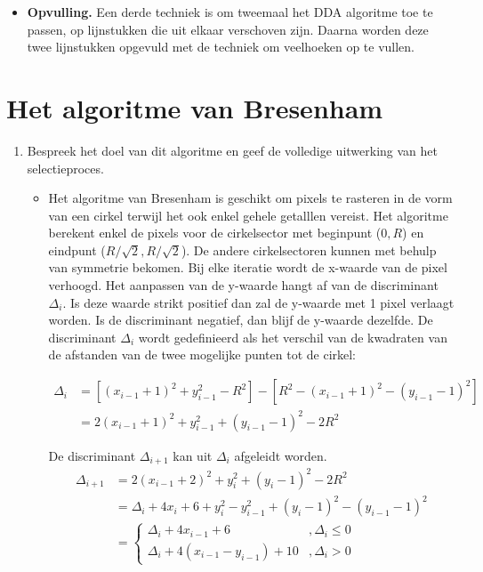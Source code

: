 \documentclass{report}
\newcommand{\vraag}[2]{
	\item #1
	
	#2
}
\begin{document}
\begin{enumerate}
{\begin{itemize}
				\item \textbf{Opvulling.} Een derde techniek is om tweemaal het DDA algoritme toe te passen, op lijnstukken die uit elkaar verschoven zijn. Daarna worden deze twee lijnstukken opgevuld met de techniek om veelhoeken op te vullen.
			\end{itemize}
		}
		
	\end{enumerate}

	\section{Het algoritme van Bresenham}
	\begin{enumerate}
		\vraag
		{
			Bespreek het doel van dit algoritme en geef de volledige uitwerking van het selectieproces. \accentuate{(§1.3)}
	    }
		{
			\begin{itemize}
				\item Het algoritme van Bresenham is geschikt om pixels te rasteren in de vorm van een cirkel terwijl het ook enkel gehele getalllen vereist. Het algoritme berekent enkel de pixels voor de cirkelsector met beginpunt ($0, R$) en eindpunt ($R/\sqrt{2},R/\sqrt{2}$). De andere cirkelsectoren kunnen met behulp van symmetrie bekomen. Bij elke iteratie wordt de x-waarde van de pixel verhoogd. Het aanpassen van de y-waarde hangt af van de discriminant $\Delta_i$. Is deze waarde strikt positief dan zal de y-waarde met 1 pixel verlaagt worden. Is de discriminant negatief, dan blijf de y-waarde dezelfde. De discriminant $\Delta_i$ wordt gedefinieerd als het verschil van de kwadraten van de afstanden van de twee mogelijke punten tot de cirkel:
				
				\begin{equation*}
					\begin{split}
						\Delta_i & = [(x_{i - 1} + 1)^2 + y_{i - 1}^2 - R^2] - [R^2 - (x_{i - 1} + 1)^2 - (y_{i - 1} - 1)^2]  \\
						& = 2(x_{i - 1} + 1)^2 + y_{i - 1}^2 + (y_{i - 1} - 1)^2 - 2R^2
					\end{split}
				\end{equation*}	
				
				De discriminant $\Delta_{i + 1}$ kan uit $\Delta_i$ afgeleidt worden.
				\begin{equation*}
					\begin{split}
						\Delta_{i + 1} & = 2(x_{i - 1} + 2)^2 + y_i^2 + (y_i - 1)^2 - 2R^2 \\
									   & = \Delta_i + 4x_i + 6 + y_i^2 - y_{i - 1}^2 + (y_i - 1)^2 - (y_{i - 1} - 1)^2 \\
									   & = \begin{cases}
											  \Delta_i + 4x_{i - 1} + 6 &, \Delta_i \leq 0 \\
											  \Delta_i + 4(x_{i - 1} - y_{i - 1}) + 10  &, \Delta_i > 0
									 	   \end{cases}
					\end{split}
				\end{equation*}
				

\end{itemize}}
\end{enumerate}
\end{document}
